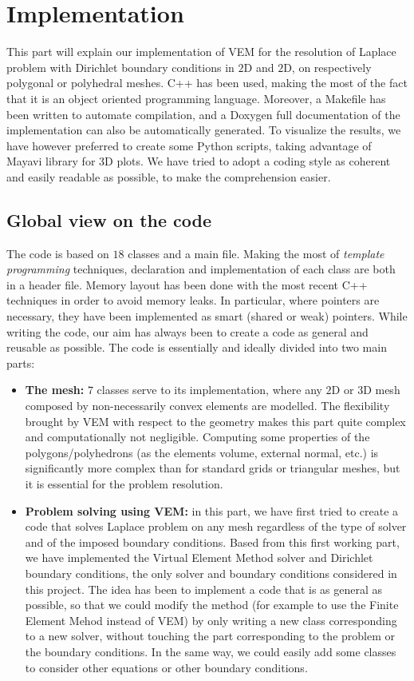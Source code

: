 \newpage
\section{Implementation}

This part will explain our implementation of VEM for the resolution of Laplace problem with Dirichlet boundary conditions in $2$D and $2$D, on respectively polygonal or polyhedral meshes. C++ has been used, making the most of the fact that it is an object oriented programming language. Moreover, a Makefile has been written to automate compilation, and a Doxygen full documentation of the implementation can also be automatically generated. To visualize the results, we have however preferred to create some Python scripts, taking advantage of Mayavi library for $3$D plots. We have tried to adopt a coding style as coherent and easily readable as possible, to make the comprehension easier. 

\subsection{Global view on the code}
The code is based on $18$ classes and a main file. Making the most of \textit{template programming} techniques, declaration and implementation of each class are both in a header file. Memory layout has been done with the most recent C++ techniques in order to avoid memory leaks. In particular, where pointers are necessary, they have been implemented as smart (shared or weak) pointers. While writing the code, our aim has always been to create a code as general and reusable as possible. The code is essentially and ideally divided into two main parts:
\begin{itemize}
\item \textbf{The mesh:} $7$ classes serve to its implementation, where any $2$D or $3$D mesh composed by non-necessarily convex elements are modelled. The flexibility brought by VEM with respect to the geometry makes this part quite complex and computationally not negligible. Computing some properties of the polygons/polyhedrons (as the elements volume, external normal, etc.) is significantly more complex than for standard grids or triangular meshes, but it is essential for the problem resolution. 
\item \textbf{Problem solving using VEM:} in this part, we have first tried to create a code that solves Laplace problem on any mesh regardless of the type of solver and of the imposed boundary conditions. Based from this first working part, we have implemented the Virtual Element Method solver and Dirichlet boundary conditions, the only solver and boundary conditions considered in this project. The idea has been to implement a code that is as general as possible, so that we could modify the method (for example to use the Finite Element Mehod instead of VEM) by only writing a new class corresponding to a new solver, without touching the part corresponding to the problem or the boundary conditions. In the same way, we could easily add some classes to consider other equations or other boundary conditions. 
\end{itemize}

